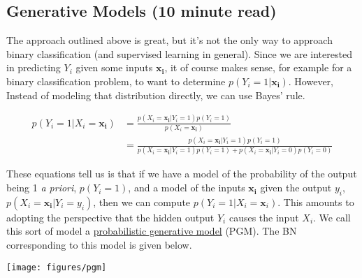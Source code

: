 \documentclass[assignment02_Solutions]{subfiles}
\begin{document}
\subsection{Generative Models (10 minute read)}
The approach outlined above is great, but it's not the only way to approach binary classification (and supervised learning in general).  Since we are interested in predicting $Y_i$ given some inputs $\mathbf{x_i}$, it of course makes sense, for example for a binary classification problem, to want to determine $p(Y_i = 1 | \mathbf{x_i})$.  However, Instead of modeling that distribution directly, we can use Bayes' rule.

\begin{align}
p(Y_i  = 1 | X_i = \mathbf{x_i}) &= \frac{p(X_i = \mathbf{x_i} | Y_i = 1) p(Y_i = 1)}{p(X_i = \mathbf{x_i})} \label{eq:pgm} \\
&= \frac{p(X_i = \mathbf{x_i} | Y_i = 1) p(Y_i = 1)}{p(X_i =  \mathbf{x_i} | Y_i = 1) p(Y_i = 1) + p(X_i = \mathbf{x_i} | Y_i = 0) p(Y_i = 0)} \nonumber
\end{align}

These equations tell us is that if we have a model of the probability of the output being 1 \emph{a priori}, $p(Y_i = 1)$, and a model of the inputs $\mathbf{x_i}$ given the output $y_i$, $p(X_i = \mathbf{x_i} | Y_i = y_i)$, then we can compute $p(Y_i = 1 | X_i = \mathbf{x}_i)$.  This amounts to adopting the perspective that the hidden output $Y_i$ causes the input $X_i$.  We call this sort of model a \href{https://en.wikipedia.org/wiki/Generative_model}{probabilistic generative model} (PGM).  The BN corresponding to this model is given below.

\begin{center}
\texttt{[image: figures/pgm]}
\end{center}
\end{document}
